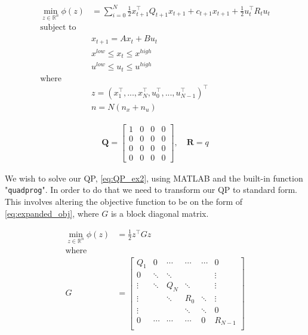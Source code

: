 \begin{subequations}\label{eq:QP_ex2}
\begin{align}
    \min_{z\in\mathbb{R}^n} \phi(z) &= \sum_{i=0}^N \frac{1}{2}x_{t+1}^{\top}Q_{t+1}x_{t+1} + c_{t+1}x_{t+1} + \frac{1}{2}u_t^{\top} R_tu_t\label{eq:obj}\\
    \text{subject to}\nonumber \\ 
    &x_{t+1} = Ax_t + Bu_t\label{eq:QP_modelConstraints} \\
    &x^{low} \leq x_t \leq x^{high}\label{eq:QP_stateConstraint} \\
    &u^{low} \leq u_t \leq u^{high}\\
    \text{where}\nonumber \\ 
    &z = (x_1^\top,...,x_N^\top,u_0^\top,...,u_{N-1}^\top)^\top\\
    &n = N(n_x +n_u)
\end{align}
\end{subequations}

\begin{equation}\label{eq:QP_transform}
    \begin{aligned}
        \mathbf{Q} =
        \begin{bmatrix} 1 & 0 & 0 & 0 \\ 0 & 0 & 0 & 0 \\ 0 & 0 & 0 & 0 \\ 0 & 0 & 0 & 0  \end{bmatrix}, \quad
        \mathbf{R} = q
    \end{aligned}
\end{equation}

We wish to solve our QP, \cref{eq:QP_ex2}, using MATLAB and the built-in function "\texttt{quadprog}". In order to do that we need to transform our QP to standard form. This involves altering the objective function to be on the form of \cref{eq:expanded_obj}, where $G$ is a block diagonal matrix.

\begin{subequations}\label{eq:expanded_obj}
\begin{align}
    \min_{z\in\mathbb{R}^n} \phi(z) &= \frac{1}{2} z^{\top}Gz\\
    \text{where}\nonumber \\
    G &= \begin{bmatrix}
       Q_1 & 0 & \cdots & \cdots & \cdots & 0 \\
       0   & \ddots & \ddots & & & \vdots \\
       \vdots   & \ddots & Q_N & \ddots & & \vdots \\
       \vdots  & & \ddots & R_0 & \ddots &  \vdots \\
       \vdots  & & & \ddots & \ddots  &  0 \\
       0  & \cdots & \cdots & \cdots & 0  &  R_{N-1} \\
    \end{bmatrix}
\end{align}
\end{subequations}

